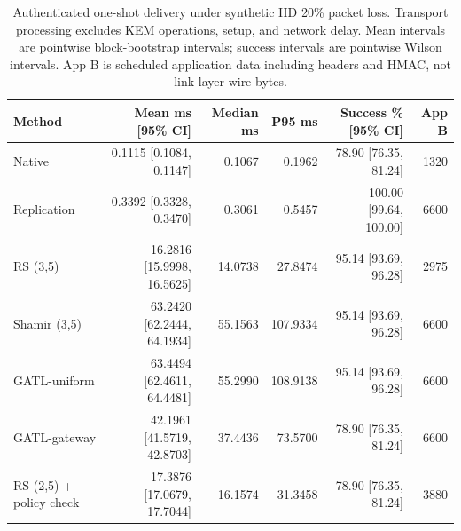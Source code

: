 \begin{table}[t]
\centering\footnotesize
\caption{Authenticated one-shot delivery under synthetic IID 20\% packet loss. Transport processing excludes KEM operations, setup, and network delay. Mean intervals are pointwise block-bootstrap intervals; success intervals are pointwise Wilson intervals. App B is scheduled application data including headers and HMAC, not link-layer wire bytes.}
\label{tab:measured-gatl-results}
\begin{tabular}{lrrrrr}
\hline
Method & Mean ms [95\% CI] & Median ms & P95 ms & Success \% [95\% CI] & App B\\
\hline
Native & 0.1115 [0.1084, 0.1147] & 0.1067 & 0.1962 & 78.90 [76.35, 81.24] & 1320\\
Replication & 0.3392 [0.3328, 0.3470] & 0.3061 & 0.5457 & 100.00 [99.64, 100.00] & 6600\\
RS (3,5) & 16.2816 [15.9998, 16.5625] & 14.0738 & 27.8474 & 95.14 [93.69, 96.28] & 2975\\
Shamir (3,5) & 63.2420 [62.2444, 64.1934] & 55.1563 & 107.9334 & 95.14 [93.69, 96.28] & 6600\\
GATL-uniform & 63.4494 [62.4611, 64.4481] & 55.2990 & 108.9138 & 95.14 [93.69, 96.28] & 6600\\
GATL-gateway & 42.1961 [41.5719, 42.8703] & 37.4436 & 73.5700 & 78.90 [76.35, 81.24] & 6600\\
RS (2,5) + policy check & 17.3876 [17.0679, 17.7044] & 16.1574 & 31.3458 & 78.90 [76.35, 81.24] & 3880\\
\hline
\end{tabular}
\end{table}
